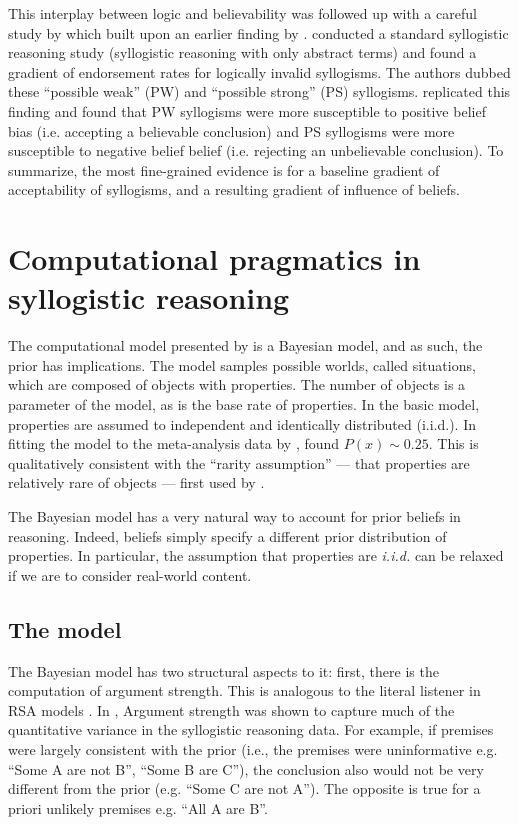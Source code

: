 \documentclass{llncs} %
\begin{document}
This interplay between logic and believability was followed up with a careful study by  which built upon an earlier finding by .  conducted a standard syllogistic reasoning study (syllogistic reasoning with only abstract terms) and found a gradient of endorsement rates for logically invalid syllogisms. The authors dubbed these ``possible weak'' (PW) and ``possible strong'' (PS) syllogisms.  replicated this finding and found that PW syllogisms were more susceptible to positive belief bias (i.e. accepting a believable conclusion) and PS syllogisms were more susceptible to negative belief belief (i.e. rejecting an unbelievable conclusion). To summarize, the most fine-grained evidence is for a baseline gradient of acceptability of syllogisms, and a resulting gradient of influence of beliefs. 



\section{Computational pragmatics in syllogistic reasoning}

The computational model presented by  is a Bayesian model, and as such, the prior has implications. The model samples possible worlds, called situations, which are composed of objects with properties. The number of objects is a parameter of the model, as is the base rate of properties. In the basic model, properties are assumed to independent and identically distributed (i.i.d.). In fitting the model to the meta-analysis data by ,  found $P(x) \sim 0.25$. This is qualitatively consistent with the ``rarity assumption'' --- that properties are relatively rare of objects --- first used by .

The Bayesian model has a very natural way to account for prior beliefs in reasoning. Indeed, beliefs simply specify a different prior distribution of properties. In particular, the assumption that properties are \emph{i.i.d.} can be relaxed if we are to consider real-world content.

\subsection{The model}

The Bayesian model has two structural aspects to it: first, there is the computation of argument strength. This is analogous to the literal listener in RSA models \cite{Frank2012; Goodman2013}. In \cite{Tessler2014}, Argument strength was shown to capture much of the quantitative variance in the syllogistic reasoning data. For example, if premises were largely consistent with the prior (i.e., the premises were uninformative e.g. ``Some A are not B'', ``Some B are C''), the conclusion also would not be very different from the prior (e.g. ``Some C are not A''). The opposite is true for a priori unlikely premises e.g. ``All A are B''.  
\end{document}
